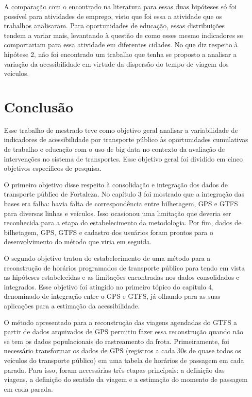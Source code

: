 \documentclass[        
    a4paper,          %
    12pt,             %
    chapter=TITLE,    %
    section=Title,    %
    subsection=Title, %
    oneside,          %
    english,          %
    spanish,          %
    brazil,           %
    fleqn             %
]{abntex2}
\begin{document}
  A comparação com o encontrado na literatura para essas duas hipóteses só foi possível para atividades de emprego, visto que foi essa a atividade que os trabalhos analisaram. Para oportunidades de educação, essas distribuições tendem a variar mais, levantando à questão de como esses mesmo indicadores se comportariam para essa atividade em diferentes cidades. No que diz respeito à hipótese 2, não foi encontrado um trabalho que tenha se proposto a analisar a variação da acessibilidade em virtude da dispersão do tempo de viagem dos veículos.
  
  \hypertarget{conclusao}{%
  \chapter{Conclusão}\label{conclusao}}
  
  Esse trabalho de mestrado teve como objetivo geral analisar a variabilidade de indicadores de acessibilidade por transporte público às oportunidades cumulativas de trabalho e educação com o uso de big data no contexto da avaliação de intervenções no sistema de transportes. Esse objetivo geral foi dividido em cinco objetivos específicos de pesquisa.
  
  O primeiro objetivo disse respeito à consolidação e integração dos dados de transporte público de Fortaleza. No capítulo 3 foi mostrado que a integração das bases era falha: havia falta de correspondência entre bilhetagem, GPS e GTFS para diversas linhas e veículos. Isso ocasionou uma limitação que deveria ser reconhecida para a etapa do estabelecimento da metodologia. Por fim, dados de bilhetagem, GPS, GTFS e cadastro dos usuários foram prontos para o desenvolvimento do método que viria em seguida.
  
  O segundo objetivo tratou do estabelecimento de uma método para a reconstrução de horários programados de transporte público para tendo em vista as hipóteses estabelecidas e as limitações encontradas nos dados consolidados e integrados. Esse objetivo foi atingido no primeiro tópico do capítulo 4, denominado de integração entre o GPS e GTFS, já olhando para as suas aplicações para a estimação da acessibilidade.
  
  O método apresentado para a reconstrução das viagens agendadas do GTFS a partir de dados arquivados de GPS permitiu fazer essa reconstrução quando não se tem os dados populacionais do rastreamento da frota. Primeiramente, foi necessário transformar os dados de GPS (registros a cada 30s de quase todos os veículos do transporte público) em uma tabela de horários de passagem em cada parada. Para isso, foram necessárias três etapas principais: a definição das viagens, a definição do sentido da viagem e a estimação do momento de passagem em cada parada.
  
\end{document}
